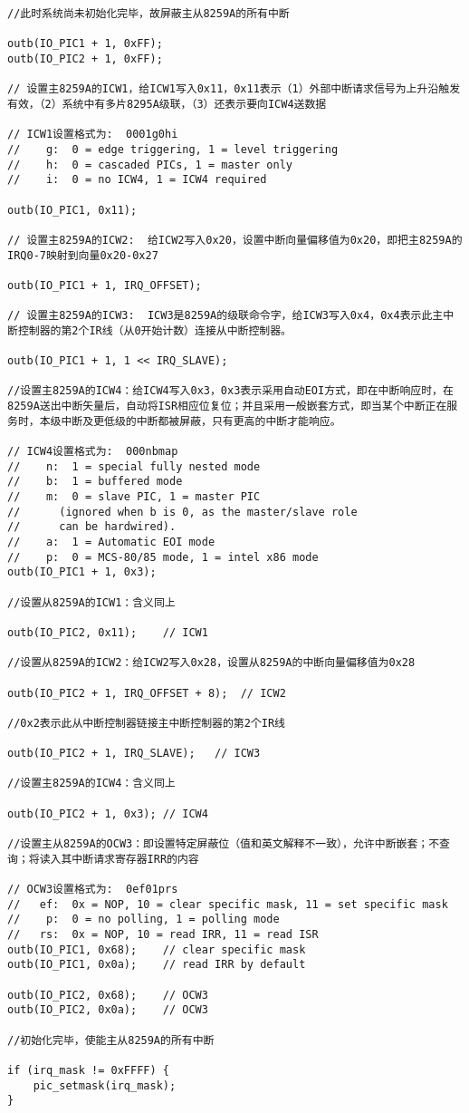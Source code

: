 \begin{lstlisting}
//此时系统尚未初始化完毕，故屏蔽主从8259A的所有中断

outb(IO_PIC1 + 1, 0xFF);
outb(IO_PIC2 + 1, 0xFF);

// 设置主8259A的ICW1，给ICW1写入0x11，0x11表示（1）外部中断请求信号为上升沿触发有效，（2）系统中有多片8295A级联，（3）还表示要向ICW4送数据

// ICW1设置格式为:  0001g0hi  
//    g:  0 = edge triggering, 1 = level triggering  
//    h:  0 = cascaded PICs, 1 = master only  
//    i:  0 = no ICW4, 1 = ICW4 required  

outb(IO_PIC1, 0x11);

// 设置主8259A的ICW2:  给ICW2写入0x20，设置中断向量偏移值为0x20，即把主8259A的IRQ0-7映射到向量0x20-0x27

outb(IO_PIC1 + 1, IRQ_OFFSET);

// 设置主8259A的ICW3:  ICW3是8259A的级联命令字，给ICW3写入0x4，0x4表示此主中断控制器的第2个IR线（从0开始计数）连接从中断控制器。

outb(IO_PIC1 + 1, 1 << IRQ_SLAVE);

//设置主8259A的ICW4：给ICW4写入0x3，0x3表示采用自动EOI方式，即在中断响应时，在8259A送出中断矢量后，自动将ISR相应位复位；并且采用一般嵌套方式，即当某个中断正在服务时，本级中断及更低级的中断都被屏蔽，只有更高的中断才能响应。

// ICW4设置格式为:  000nbmap
//    n:  1 = special fully nested mode
//    b:  1 = buffered mode
//    m:  0 = slave PIC, 1 = master PIC
//      (ignored when b is 0, as the master/slave role
//      can be hardwired).
//    a:  1 = Automatic EOI mode
//    p:  0 = MCS-80/85 mode, 1 = intel x86 mode
outb(IO_PIC1 + 1, 0x3);

//设置从8259A的ICW1：含义同上

outb(IO_PIC2, 0x11);    // ICW1

//设置从8259A的ICW2：给ICW2写入0x28，设置从8259A的中断向量偏移值为0x28

outb(IO_PIC2 + 1, IRQ_OFFSET + 8);  // ICW2

//0x2表示此从中断控制器链接主中断控制器的第2个IR线

outb(IO_PIC2 + 1, IRQ_SLAVE);   // ICW3

//设置主8259A的ICW4：含义同上

outb(IO_PIC2 + 1, 0x3); // ICW4

//设置主从8259A的OCW3：即设置特定屏蔽位（值和英文解释不一致），允许中断嵌套；不查询；将读入其中断请求寄存器IRR的内容

// OCW3设置格式为:  0ef01prs
//   ef:  0x = NOP, 10 = clear specific mask, 11 = set specific mask
//    p:  0 = no polling, 1 = polling mode
//   rs:  0x = NOP, 10 = read IRR, 11 = read ISR
outb(IO_PIC1, 0x68);    // clear specific mask
outb(IO_PIC1, 0x0a);    // read IRR by default

outb(IO_PIC2, 0x68);    // OCW3
outb(IO_PIC2, 0x0a);    // OCW3

//初始化完毕，使能主从8259A的所有中断

if (irq_mask != 0xFFFF) {
    pic_setmask(irq_mask);
}
\end{lstlisting}

